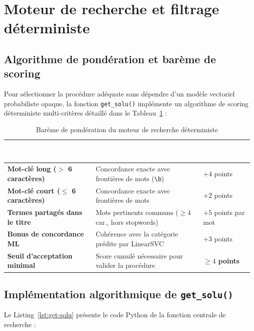 \documentclass[12pt, a4paper, oneside]{report}
\begin{document}
\section{Moteur de recherche et filtrage déterministe}

\subsection{Algorithme de pondération et barème de scoring}

Pour sélectionner la procédure adéquate sans dépendre d'un modèle vectoriel probabiliste opaque, la fonction \texttt{get\_solu()} implémente un algorithme de scoring déterministe multi-critères détaillé dans le Tableau~\ref{tab:scoring} :

\begin{table}[H]
\centering
\caption{Barème de pondération du moteur de recherche déterministe}
\label{tab:scoring}
\begin{tabularx}{\textwidth}{|>{\bfseries}p{5cm}|X|p{2.5cm}|}
\hline
\rowcolor{themeDark}
\textcolor{white}{Critère de correspondance} &
\textcolor{white}{Règle de détection lexicale} &
\textcolor{white}{Points attribués} \\
\hline
Mot-clé long ($>$ 6 caractères) & Concordance exacte avec frontières de mots (\verb|\b|) & $+4$ points \\
\hline
Mot-clé court ($\leq$ 6 caractères) & Concordance exacte avec frontières de mots & $+2$ points \\
\hline
Termes partagés dans le titre & Mots pertinents communs ($\geq 4$ car., hors stopwords) & $+5$ points par mot \\
\hline
Bonus de concordance ML & Cohérence avec la catégorie prédite par LinearSVC & $+3$ points \\
\hline
\textbf{Seuil d'acceptation minimal} & Score cumulé nécessaire pour valider la procédure & \textbf{$\geq 4$ points} \\
\hline
\end{tabularx}
\end{table}

\subsection{Implémentation algorithmique de \texttt{get\_solu()}}

Le Listing~\ref{lst:get-solu} présente le code Python de la fonction centrale de recherche :
\end{document}
